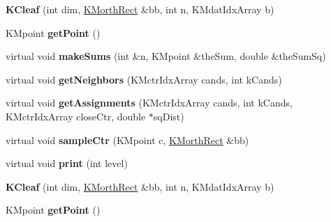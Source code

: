 \begin{DoxyCompactItemize}
\item 
\hypertarget{class_k_cleaf_ac1a124af424d6eb851ecaa99c2ddeb89}{
{\bfseries KCleaf} (int dim, \hyperlink{class_k_morth_rect}{KMorthRect} \&bb, int n, KMdatIdxArray b)}
\label{class_k_cleaf_ac1a124af424d6eb851ecaa99c2ddeb89}

\item 
\hypertarget{class_k_cleaf_aafec4aa934ee01842ac6f7bb3b5017a7}{
KMpoint {\bfseries getPoint} ()}
\label{class_k_cleaf_aafec4aa934ee01842ac6f7bb3b5017a7}

\item 
\hypertarget{class_k_cleaf_a5d28d77b5b5998d9f586b3e21e4442d3}{
virtual void {\bfseries makeSums} (int \&n, KMpoint \&theSum, double \&theSumSq)}
\label{class_k_cleaf_a5d28d77b5b5998d9f586b3e21e4442d3}

\item 
\hypertarget{class_k_cleaf_a27fe309cc1c35957e9776f91e259c633}{
virtual void {\bfseries getNeighbors} (KMctrIdxArray cands, int kCands)}
\label{class_k_cleaf_a27fe309cc1c35957e9776f91e259c633}

\item 
\hypertarget{class_k_cleaf_acd0a2647ac4c78eac9e8ef66e689cc15}{
virtual void {\bfseries getAssignments} (KMctrIdxArray cands, int kCands, KMctrIdxArray closeCtr, double $\ast$sqDist)}
\label{class_k_cleaf_acd0a2647ac4c78eac9e8ef66e689cc15}

\item 
\hypertarget{class_k_cleaf_a6eb0dea2d37d4919836e09859897158f}{
virtual void {\bfseries sampleCtr} (KMpoint c, \hyperlink{class_k_morth_rect}{KMorthRect} \&bb)}
\label{class_k_cleaf_a6eb0dea2d37d4919836e09859897158f}

\item 
\hypertarget{class_k_cleaf_ad957b094c62aabb9641efb0b95619ed6}{
virtual void {\bfseries print} (int level)}
\label{class_k_cleaf_ad957b094c62aabb9641efb0b95619ed6}

\item 
\hypertarget{class_k_cleaf_ac1a124af424d6eb851ecaa99c2ddeb89}{
{\bfseries KCleaf} (int dim, \hyperlink{class_k_morth_rect}{KMorthRect} \&bb, int n, KMdatIdxArray b)}
\label{class_k_cleaf_ac1a124af424d6eb851ecaa99c2ddeb89}

\item 
\hypertarget{class_k_cleaf_aafec4aa934ee01842ac6f7bb3b5017a7}{
KMpoint {\bfseries getPoint} ()}
\label{class_k_cleaf_aafec4aa934ee01842ac6f7bb3b5017a7}


\end{DoxyCompactItemize}

